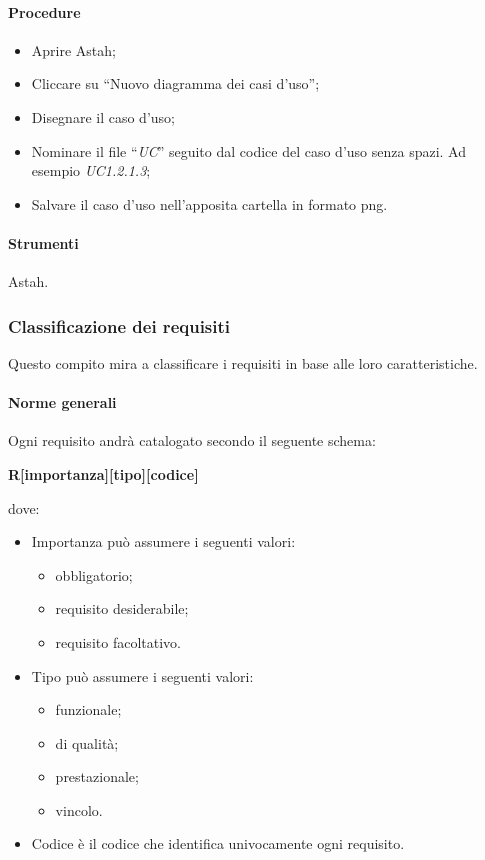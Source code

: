 \paragraph{Procedure}
\begin{itemize}
\item Aprire Astah;
\item Cliccare su ``Nuovo diagramma dei casi d'uso'';
\item Disegnare il caso d'uso;
\item Nominare il file ``\textit{UC}'' seguito dal codice del caso d'uso senza spazi. Ad esempio \textit{UC1.2.1.3};
\item Salvare il caso d'uso nell'apposita cartella in formato png.

\end{itemize}


\paragraph{Strumenti}
Astah.



\subsubsection{Classificazione dei requisiti}
Questo compito mira a classificare i requisiti in base alle loro caratteristiche.

\paragraph{Norme generali}
Ogni requisito andrà catalogato secondo il seguente schema:

\begin{center}
\textbf{R[importanza][tipo][codice]}
\end{center}
dove:
\begin{itemize}
\item Importanza può assumere i seguenti valori:
\begin{itemize}
\item {}  obbligatorio;
\item {} requisito desiderabile;
\item {} requisito facoltativo.
\end{itemize}
\item Tipo può assumere i seguenti valori:
\begin{itemize}
\item {} funzionale;
\item {} di qualità;
\item {} prestazionale;
\item {} vincolo.
\end{itemize}
\item Codice è il codice che identifica univocamente ogni requisito.
\end{itemize}

